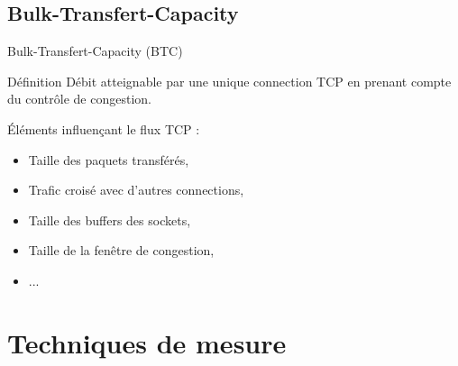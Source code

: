 \documentclass[compress]{beamer}
\begin{document}

\subsection{Bulk-Transfert-Capacity}
\begin{frame}{Bulk-Transfert-Capacity (BTC)}
	\begin{alertblock}{Définition}
		Débit atteignable par une unique connection TCP en prenant compte du contrôle de congestion.
	\end{alertblock}
	Éléments influençant le flux TCP : 
	\begin{itemize}
		\item Taille des paquets transférés,
		\item Trafic croisé avec d'autres connections,
		\item Taille des buffers des sockets,
		\item Taille de la fenêtre de congestion,
		\item ...
	\end{itemize}
\end{frame}


\section{Techniques de mesure}
\end{document}
